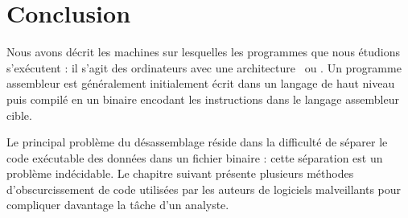 \section*{Conclusion}
Nous avons décrit les machines sur lesquelles les programmes que nous étudions s'exécutent : il s'agit des ordinateurs avec une architecture \xq\ ou \xs.
Un programme assembleur est généralement initialement écrit dans un langage de haut niveau puis compilé en un binaire encodant les instructions dans le langage assembleur cible.

Le principal problème du désassemblage réside dans la difficulté de séparer le code exécutable des données dans un fichier binaire : cette séparation est un problème indécidable.
Le chapitre suivant présente plusieurs méthodes d'obscurcissement de code utilisées par les auteurs de logiciels malveillants pour compliquer davantage la tâche d'un analyste.
